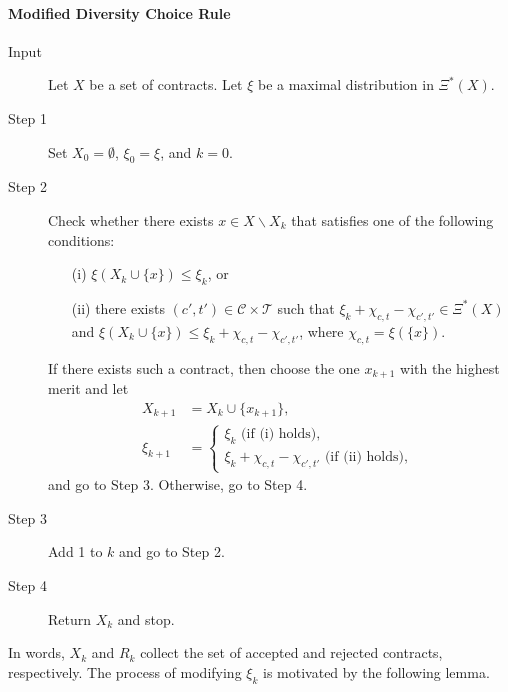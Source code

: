 \documentclass[12pt]{amsart}
\theoremstyle{remark}
\begin{document}
\paragraph{\textbf{Modified Diversity Choice Rule}}
\begin{description}
  \item[Input] Let $X$ be a set of contracts. Let $\xi$ be a maximal distribution in $\Xi^*(X)$.
  \item[Step 1]  Set $X_0=\emptyset$, $\xi_0=\xi$, and $k=0$.
  \item[Step 2] Check whether there exists $x\in X\backslash X_k$ that satisfies one of the following conditions:
  \begin{itemize}
  \item[(i)]  $\xi(X_{k}\cup\{x\})\leq \xi_{k}$, or
  \item[(ii)] there exists $(c',t')\in \mathcal{C}\times \mathcal{T}$ such that $\xi_{k}+\chi_{c,t}-\chi_{c',t'}\in \Xi^*(X)$ and $\xi(X_{k}\cup \{x\})\leq \xi_{k}+\chi_{c,t}-\chi_{c',t'}$, where $\chi_{c,t}=\xi(\{x\})$.
  \end{itemize}
  If there exists such a contract, then choose the one $x_{k+1}$ with the highest merit and let
\begin{align*}
X_{k+1}&=X_{k}\cup \{x_{k+1}\}, \;  \\
\xi_{k+1}&=\begin{cases} \xi_{k} \text{ (if (i) holds), } \\
                              \xi_{k}+\chi_{c,t}-\chi_{c',t'} \text{ (if (ii) holds), }
               \end{cases}
\end{align*}
and go to Step 3. Otherwise, go to Step 4.
  \item[Step 3] Add 1 to $k$ and go to Step 2.
  \item[Step 4] Return $X_{k}$ and stop.
\end{description}
In words, $X_k$ and $R_k$ collect the set of accepted and rejected contracts, respectively.
The process of modifying $\xi_k$ is motivated by the following lemma.
\end{document}

